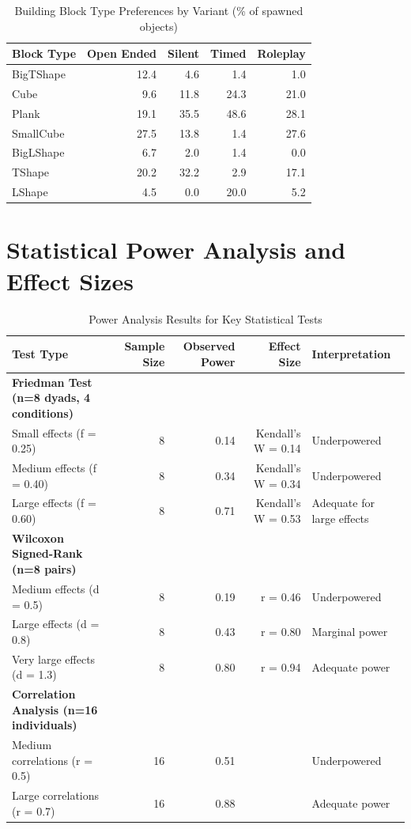 \begin{table}[H]
\centering
\caption{Building Block Type Preferences by Variant (\% of spawned objects)}
\label{tab:block_preferences_complete}
\begin{tabular}{lrrrr}
\toprule
\textbf{Block Type} & \textbf{Open Ended} & \textbf{Silent} & \textbf{Timed} & \textbf{Roleplay} \\
\midrule
BigTShape & 12.4 & 4.6 & 1.4 & 1.0 \\
Cube & 9.6 & 11.8 & 24.3 & 21.0 \\
Plank & 19.1 & 35.5 & 48.6 & 28.1 \\
SmallCube & 27.5 & 13.8 & 1.4 & 27.6 \\
BigLShape & 6.7 & 2.0 & 1.4 & 0.0 \\
TShape & 20.2 & 32.2 & 2.9 & 17.1 \\
LShape & 4.5 & 0.0 & 20.0 & 5.2 \\
\bottomrule
\end{tabular}
\end{table}

\section{Statistical Power Analysis and Effect Sizes}
\label{appendix:power_analysis}

\begin{table}[H]
\centering
\caption{Power Analysis Results for Key Statistical Tests}
\label{tab:power_analysis_complete}
\begin{tabular}{lrrrl}
\toprule
\textbf{Test Type} & \textbf{Sample Size} & \textbf{Observed Power} & \textbf{Effect Size} & \textbf{Interpretation} \\
\midrule
\textbf{Friedman Test (n=8 dyads, 4 conditions)} & & & & \\
Small effects (f = 0.25) & 8 & 0.14 & Kendall's W = 0.14 & Underpowered \\
Medium effects (f = 0.40) & 8 & 0.34 & Kendall's W = 0.34 & Underpowered \\
Large effects (f = 0.60) & 8 & 0.71 & Kendall's W = 0.53 & Adequate for large effects \\
\midrule
\textbf{Wilcoxon Signed-Rank (n=8 pairs)} & & & & \\
Medium effects (d = 0.5) & 8 & 0.19 & r = 0.46 & Underpowered \\
Large effects (d = 0.8) & 8 & 0.43 & r = 0.80 & Marginal power \\
Very large effects (d = 1.3) & 8 & 0.80 & r = 0.94 & Adequate power \\
\midrule
\textbf{Correlation Analysis (n=16 individuals)} & & & & \\
Medium correlations (r = 0.5) & 16 & 0.51 & & Underpowered \\
Large correlations (r = 0.7) & 16 & 0.88 & & Adequate power \\
\bottomrule
\end{tabular}
\end{table}

